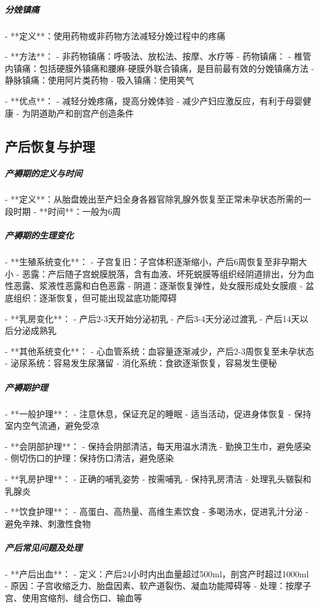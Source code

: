 \begin{enumerate}
\subparagraph{分娩镇痛}

- **定义**：使用药物或非药物方法减轻分娩过程中的疼痛

- **方法**：
  - 非药物镇痛：呼吸法、放松法、按摩、水疗等
  - 药物镇痛：
    - 椎管内镇痛：包括硬膜外镇痛和腰麻-硬膜外联合镇痛，是目前最有效的分娩镇痛方法
    - 静脉镇痛：使用阿片类药物
    - 吸入镇痛：使用笑气

- **优点**：
  - 减轻分娩疼痛，提高分娩体验
  - 减少产妇应激反应，有利于母婴健康
  - 为阴道助产和剖宫产创造条件

\subsection{产后恢复与护理}

\subparagraph{产褥期的定义与时间}

- **定义**：从胎盘娩出至产妇全身各器官除乳腺外恢复至正常未孕状态所需的一段时期
- **时间**：一般为6周

\subparagraph{产褥期的生理变化}

- **生殖系统变化**：
  - 子宫复旧：子宫体积逐渐缩小，产后6周恢复至非孕期大小
  - 恶露：产后随子宫蜕膜脱落，含有血液、坏死蜕膜等组织经阴道排出，分为血性恶露、浆液性恶露和白色恶露
  - 阴道：逐渐恢复弹性，处女膜形成处女膜痕
  - 盆底组织：逐渐恢复，但可能出现盆底功能障碍

- **乳房变化**：
  - 产后2-3天开始分泌初乳
  - 产后3-4天分泌过渡乳
  - 产后14天以后分泌成熟乳

- **其他系统变化**：
  - 心血管系统：血容量逐渐减少，产后2-3周恢复至未孕状态
  - 泌尿系统：容易发生尿潴留
  - 消化系统：食欲逐渐恢复，容易发生便秘

\subparagraph{产褥期护理}

- **一般护理**：
  - 注意休息，保证充足的睡眠
  - 适当活动，促进身体恢复
  - 保持室内空气流通，避免受凉

- **会阴部护理**：
  - 保持会阴部清洁，每天用温水清洗
  - 勤换卫生巾，避免感染
  - 侧切伤口的护理：保持伤口清洁，避免感染

- **乳房护理**：
  - 正确的哺乳姿势
  - 按需哺乳
  - 保持乳房清洁
  - 处理乳头皲裂和乳腺炎

- **饮食护理**：
  - 高蛋白、高热量、高维生素饮食
  - 多喝汤水，促进乳汁分泌
  - 避免辛辣、刺激性食物

\subparagraph{产后常见问题及处理}

- **产后出血**：
  - 定义：产后24小时内出血量超过500ml，剖宫产时超过1000ml
  - 原因：子宫收缩乏力、胎盘因素、软产道裂伤、凝血功能障碍等
  - 处理：按摩子宫、使用宫缩剂、缝合伤口、输血等


\end{enumerate}
